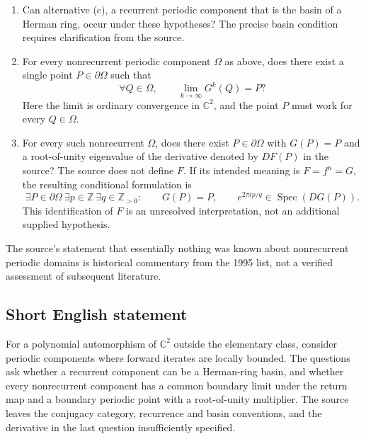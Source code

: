 \documentclass[11pt]{article}
\newcommand{\Z}{\mathbb{Z}}
\newcommand{\C}{\mathbb{C}}
\begin{document}
\begin{enumerate}
\item[(i)] Can alternative (c), a recurrent periodic component that is the basin of a Herman ring, occur under these hypotheses? The precise basin condition requires clarification from the source.
\item[(ii)] For every nonrecurrent periodic component \(\Omega\) as above, does there exist a single point \(P\in\partial\Omega\) such that
\[
\forall Q\in\Omega,\qquad \lim_{k\to\infty}G^k(Q)=P?
\]
Here the limit is ordinary convergence in \(\C^2\), and the point \(P\) must work for every \(Q\in\Omega\).
\item[(iii)] For every such nonrecurrent \(\Omega\), does there exist \(P\in\partial\Omega\) with \(G(P)=P\) and a root-of-unity eigenvalue of the derivative denoted by \(DF(P)\) in the source? The source does not define \(F\). If its intended meaning is \(F=f^n=G\), the resulting conditional formulation is
\[
\exists P\in\partial\Omega\ \exists p\in\Z\ \exists q\in\Z_{>0}:\qquad G(P)=P,\qquad e^{2\pi i p/q}\in\operatorname{Spec}(DG(P)).
\]
This identification of \(F\) is an unresolved interpretation, not an additional supplied hypothesis.
\end{enumerate}

The source's statement that essentially nothing was known about nonrecurrent periodic domains is historical commentary from the 1995 list, not a verified assessment of subsequent literature.
\subsection{Short English statement}
For a polynomial automorphism of \(\C^2\) outside the elementary class, consider periodic components where forward iterates are locally bounded. The questions ask whether a recurrent component can be a Herman-ring basin, and whether every nonrecurrent component has a common boundary limit under the return map and a boundary periodic point with a root-of-unity multiplier. The source leaves the conjugacy category, recurrence and basin conventions, and the derivative in the last question insufficiently specified.
\end{document}
